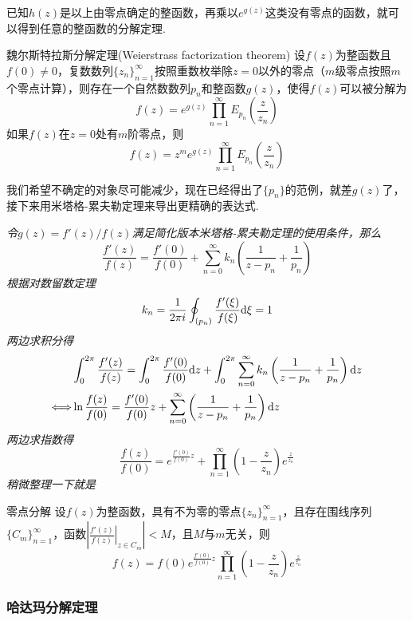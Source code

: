 已知\(h(z)\)是以上由零点确定的整函数，再乘以\(e^{g(z)}\)这类没有零点的函数，就可以得到任意的整函数的分解定理.

\begin{theorem}{魏尔斯特拉斯分解定理(Weierstrass factorization theorem)}
    设\(f(z)\)为整函数且\(f(0)\neq 0\)，复数数列\(\{z_n\}_{n=1}^{\infty}\)按照重数枚举除\(z=0\)以外的零点（\(m\)级零点按照\(m\)个零点计算），则存在一个自然数数列\(p_n\)和整函数\(g(z)\)，使得\(f(z)\)可以被分解为
    \[f(z) = e^{g(z)}\prod_{n=1}^{\infty}E_{p_n}\left(\frac{z}{z_n}\right)\]
    如果\(f(z)\)在\(z=0\)处有\(m\)阶零点，则
    \[f(z) = z^me^{g(z)}\prod_{n=1}^{\infty}E_{p_n}\left(\frac{z}{z_n}\right)\]
\end{theorem}

我们希望不确定的对象尽可能减少，现在已经得出了\(\{p_n\}\)的范例，就差\(g(z)\)了，接下来用米塔格-累夫勒定理来导出更精确的表达式.

\textit{
    令\(g(z)=f'(z)/f(z)\)满足简化版本米塔格-累夫勒定理的使用条件，那么
    \[\frac{f'(z)}{f(z)} = \frac{f'(0)}{f(0)} + \sum_{n=0}^{\infty}k_n\left(\frac{1}{z-p_n}+\frac{1}{p_n}\right)\]
    根据对数留数定理
    \[k_n = \frac{1}{2 \pi i}\oint_{(p_n)}\frac{f'(\xi)}{f(\xi)}{\rm d}\xi = 1\]
    两边求积分得
    \begin{align*}
        & \int_{0}^{2\pi}\frac{f'(z)}{f(z)} = \int_{0}^{2\pi}\frac{f'(0)}{f(0)}{\rm d}z + \int_{0}^{2\pi}\sum_{n=0}^{\infty}k_n\left(\frac{1}{z-p_n}+\frac{1}{p_n}\right){\rm d}z \\
        \Longleftrightarrow & \ln\frac{f(z)}{f(0)} = \frac{f'(0)}{f(0)}z + \sum_{n=0}^{\infty}\left(\frac{1}{z-p_n}+\frac{1}{p_n}\right){\rm d}z
    \end{align*}
    两边求指数得
    \[\frac{f(z)}{f(0)}=e^{\frac{f'(0)}{f(0)}z}+\prod_{n=1}^{\infty}\left(1-\frac{z}{z_n}\right)e^{\frac{z}{z_n}}\]
    稍微整理一下就是
}

\begin{corollary}{零点分解}
    设\(f(z)\)为整函数，具有不为零的零点\(\{z_n\}_{n=1}^{\infty}\)，且存在围线序列\(\{C_m\}_{n=1}^{\infty}\)，函数\(\displaystyle{\left|\left.\frac{f'(z)}{f(z)}\right|_{z \in C_m}\right| < M}\)，且\(M\)与\(m\)无关，则
    \[\boxed{f(z) = f(0)e^{\frac{f'(0)}{f(0)}z}\prod_{n=1}^{\infty}\left(1-\frac{z}{z_n}\right)e^{\frac{z}{z_n}}}\]
\end{corollary}

\subsubsection{哈达玛分解定理}

